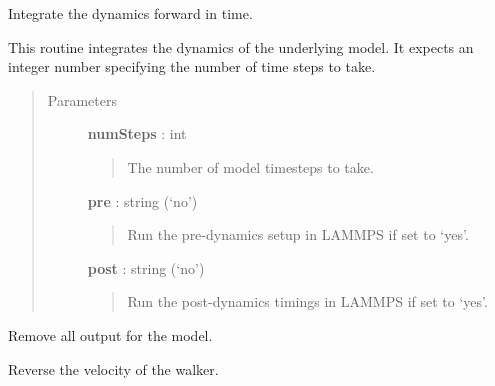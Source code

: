 \documentclass[letterpaper,10pt,english]{sphinxmanual}
\begin{document}
\begin{fulllineitems}
\begin{fulllineitems}
\end{fulllineitems}


\begin{fulllineitems}
\label{walker_api/walker_api.doc:walker_api.lammps_walker.Lammps.propagate}
Integrate the dynamics forward in time.

This routine integrates the dynamics of the underlying model. It expects an integer number specifying the number of time steps to take.
\begin{quote}\begin{description}
\item[{Parameters}] \leavevmode
\textbf{numSteps} : int
\begin{quote}

The number of model timesteps to take.
\end{quote}

\textbf{pre} : string (`no')
\begin{quote}

Run the pre-dynamics setup in LAMMPS if set to `yes'.
\end{quote}

\textbf{post} : string (`no')
\begin{quote}

Run the post-dynamics timings in LAMMPS if set to `yes'.
\end{quote}

\end{description}\end{quote}

\end{fulllineitems}


\begin{fulllineitems}
\label{walker_api/walker_api.doc:walker_api.lammps_walker.Lammps.remove_output}
Remove all output for the model.

\end{fulllineitems}


\begin{fulllineitems}
\label{walker_api/walker_api.doc:walker_api.lammps_walker.Lammps.reverse_velocity}
Reverse the velocity of the walker.


\end{fulllineitems}
\end{fulllineitems}
\end{document}
